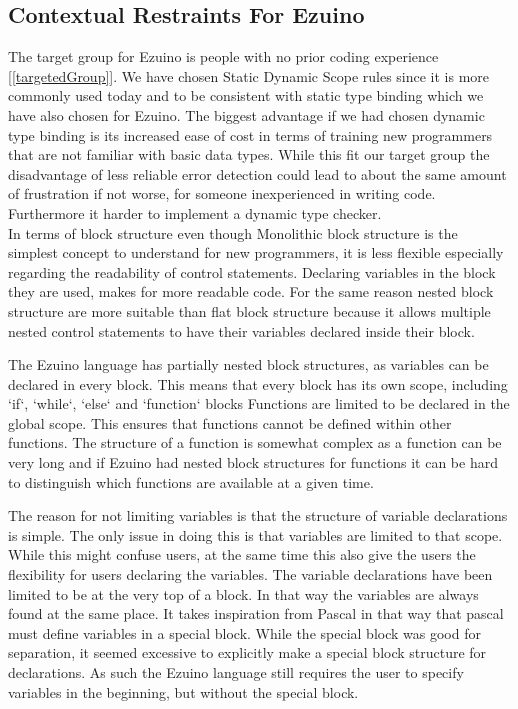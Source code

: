 \subsection*{Contextual Restraints For Ezuino}
The target group for Ezuino is people with no prior coding experience [\ref{targetedGroup}]. We have chosen Static Dynamic Scope rules since it is more commonly used today and to be consistent with static type binding which we have also chosen for Ezuino. The biggest advantage if we had chosen dynamic type binding is its increased ease of cost in terms of training new programmers that are not familiar with basic data types. While this fit our target group the disadvantage of less reliable error detection could lead to about the same amount of frustration if not worse, for someone inexperienced in writing code. Furthermore it harder to implement a dynamic type checker. \\
In terms of block structure even though Monolithic block structure is the simplest concept to understand for new programmers, it is less flexible especially regarding the readability of control statements. Declaring variables in the block they are used, makes for more readable code. For the same reason nested block structure are more suitable than flat block structure because it allows multiple nested control statements to have their variables declared inside their block. 

The Ezuino language has partially nested block structures, as variables can be declared in every block. This means that every block has its own scope, including `if`, `while`, `else` and `function` blocks
Functions are limited to be declared in the global scope. This ensures that functions cannot be defined within other functions. The structure of a function is somewhat complex as a function can be very long and if Ezuino had nested block structures for functions it can be hard to distinguish which functions are available at a given time.

The reason for not limiting variables is that the structure of variable declarations is simple. The only issue in doing this is that variables are limited to that scope. While this might confuse users, at the same time this also give the users the flexibility for users declaring the variables.
The variable declarations have been limited to be at the very top of a block. In that way the variables are always found at the same place. It takes inspiration from Pascal in that way that pascal must define variables in a special block. While the special block was good for separation, it seemed excessive to explicitly make a special block structure for declarations. As such the Ezuino language still requires the user to specify variables in the beginning, but without the special block.